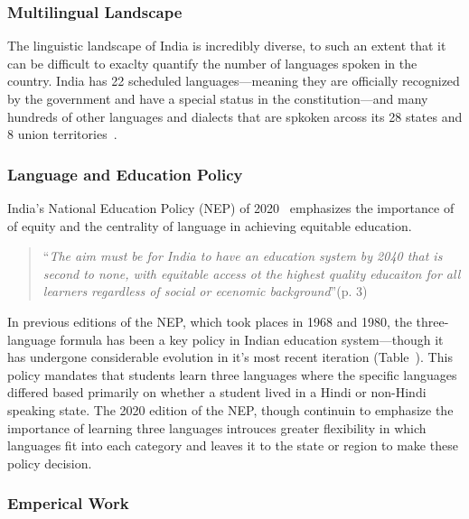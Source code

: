 \subsubsection{Multilingual Landscape}\label{subsubsec:multilingualism-in-indian-education}

The linguistic landscape of India is incredibly diverse, to such an extent that
it can be difficult to exaclty quantify the number of languages spoken in the
country. India has 22 scheduled languages---meaning they are officially
recognized by the government and have a special status in the constitution---and 
many hundreds of other languages and dialects that are spkoken arcoss its 28
states and 8 union territories~\cite{2011census}.


\subsubsection{Language and Education
Policy}\label{subsubsec:language-and-education-policy}

India's National Education Policy (NEP) of 2020~\cite{NEP2020} emphasizes the importance of
of equity and the centrality of language in achieving equitable education.
\begin{quote}
  ``\textit{The aim must be for India to have an education system by 2040 that
  is second to none, with equitable access ot the highest quality educaiton for
  all learners regardless of social or ecenomic background}''(p. 3)
\end{quote}
In previous editions of the NEP, which took places in 1968 and 1980, the
three-language formula has been a key policy in Indian education system---though
it has undergone considerable evolution in it's most recent iteration
(Table~\cite{tab:three-language-formula }). This policy mandates that students
learn three languages where the specific languages differed based primarily on
whether a student lived in a Hindi or non-Hindi speaking state. The 2020 edition
of the NEP, though continuin to emphasize the importance of learning three
languages introuces greater flexibility in which languages fit into each
category and leaves it to the state or region to make these policy decision.

\subsubsection{Emperical Work}\label{subsubsec:emperical-work}


